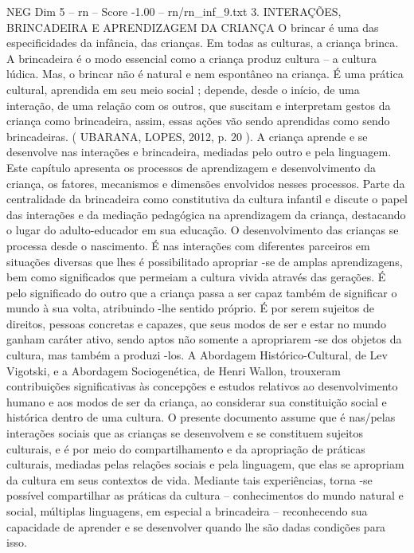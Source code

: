\begin{textsample}{NEG Dim 5 – rn – Score -1.00 – rn/rn\_inf\_9.txt}  \label{ex:f5_neg_144}
3.
INTERAÇÕES, BRINCADEIRA E APRENDIZAGEM DA CRIANÇA O brincar é uma das especificidades da infância, das crianças.
Em todas as culturas, a criança brinca.
A brincadeira é o modo essencial como a criança produz cultura – a cultura lúdica.
Mas, o brincar não é natural e nem espontâneo na criança.
É uma prática cultural, aprendida em seu meio social ; depende, desde o início, de uma interação, de uma relação com os outros, que suscitam e interpretam gestos da criança como brincadeira, assim, essas ações vão sendo aprendidas como sendo brincadeiras. ( UBARANA, LOPES, 2012, p. 20 ).
A criança aprende e se desenvolve nas interações e brincadeira, mediadas pelo outro e pela linguagem.
Este capítulo apresenta os processos de aprendizagem e desenvolvimento da criança, os fatores, mecanismos e dimensões envolvidos nesses processos.
Parte da centralidade da brincadeira como constitutiva da cultura infantil e discute o papel das interações e da mediação pedagógica na aprendizagem da criança, destacando o lugar do adulto-educador em sua educação.
O desenvolvimento das crianças se processa desde o nascimento.
É nas interações com diferentes parceiros em situações diversas que lhes é possibilitado apropriar -se de amplas aprendizagens, bem como significados que permeiam a cultura vivida através das gerações.
É pelo significado do outro que a criança passa a ser capaz também de significar o mundo à sua volta, atribuindo -lhe sentido próprio.
É por serem sujeitos de direitos, pessoas concretas e capazes, que seus modos de ser e estar no mundo ganham caráter ativo, sendo aptos não somente a apropriarem -se dos objetos da cultura, mas também a produzi -los.
A Abordagem Histórico-Cultural, de Lev Vigotski, e a Abordagem Sociogenética, de Henri Wallon, trouxeram contribuições significativas às concepções e estudos relativos ao desenvolvimento humano e aos modos de ser da criança, ao considerar sua constituição social e histórica dentro de uma cultura.
O presente documento assume que é nas/pelas interações sociais que as crianças se desenvolvem e se constituem sujeitos culturais, e é por meio do compartilhamento e da apropriação de práticas culturais, mediadas pelas relações sociais e pela linguagem, que elas se apropriam da cultura em seus contextos de vida.
Mediante tais experiências, torna -se possível compartilhar as práticas da cultura – conhecimentos do mundo natural e social, múltiplas linguagens, em especial a brincadeira – reconhecendo sua capacidade de aprender e se desenvolver quando lhe são dadas condições para isso.

\end{textsample}
